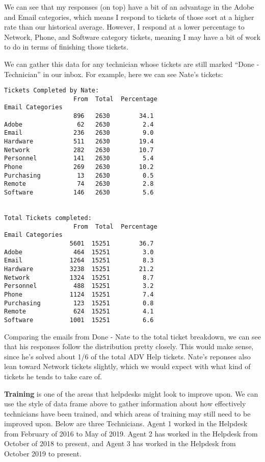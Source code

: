 \documentclass[11pt]{article}
\begin{document}
    We can see that my responses (on top) have a bit of an advantage in the
Adobe and Email categories, which means I respond to tickets of those
sort at a higher rate than our historical average. However, I respond at
a lower percentage to Network, Phone, and Software category tickets,
meaning I may have a bit of work to do in terms of finishing those
tickets.

    We can gather this data for any technician whose tickets are still
marked ``Done - Technician'' in our inbox. For example, here we can see
Nate's tickets:

    \begin{Verbatim}[commandchars=\\\{\}]
Tickets Completed by Nate:
                   From  Total  Percentage
Email Categories
                   896   2630        34.1
Adobe               62   2630         2.4
Email              236   2630         9.0
Hardware           511   2630        19.4
Network            282   2630        10.7
Personnel          141   2630         5.4
Phone              269   2630        10.2
Purchasing          13   2630         0.5
Remote              74   2630         2.8
Software           146   2630         5.6


Total Tickets completed:
                   From  Total  Percentage
Email Categories
                  5601  15251        36.7
Adobe              464  15251         3.0
Email             1264  15251         8.3
Hardware          3238  15251        21.2
Network           1324  15251         8.7
Personnel          488  15251         3.2
Phone             1124  15251         7.4
Purchasing         123  15251         0.8
Remote             624  15251         4.1
Software          1001  15251         6.6
    \end{Verbatim}

    Comparing the emails from Done - Nate to the total ticket breakdown, we
can see that his responses follow the distribution pretty closely. This
would make sense, since he's solved about 1/6 of the total ADV Help
tickets. Nate's reponses also lean toward Network tickets slightly,
which we would expect with what kind of tickets he tends to take care
of.

    \textbf{Training} is one of the areas that helpdesks might look to
improve upon. We can use the style of data frame above to gather
information about how effectively technicians have been trained, and
which areas of training may still need to be improved upon. Below are
three Technicians. Agent 1 worked in the Helpdesk from February of 2016
to May of 2019. Agent 2 has worked in the Helpdesk from October of 2018
to present, and Agent 3 has worked in the Helpdesk from October 2019 to
present.
\end{document}
